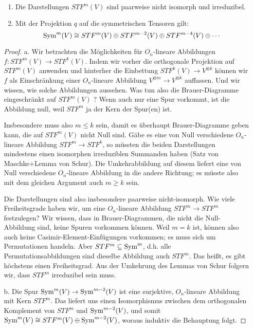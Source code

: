 \begin{theorem}
\begin{enumerate}
\item Die Darstellungen $STF^m(V)$ sind paarweise nicht isomorph und irreduzibel.
\item Mit der Projektion $q$ auf die symmetrischen Tensoren gilt:
\[\operatorname{Sym}^m(V) \cong STF^m(V) \oplus STF^{m-2}(V) \oplus STF^{m-4}(V) \oplus \cdots\]
\end{enumerate}
\end{theorem}
\begin{proof}
a. Wir betrachten die Möglichkeiten für $O_n$-lineare Abbildungen $f: STF^m(V) \to STF^k(V)$. Indem wir vorher die orthogonale Projektion auf $STF^m(V)$ anwenden und hinterher die Einbettung $STF^k(V) \to V^{\otimes k}$ können wir $f$ als Einschränkung einer $O_n$-lineare Abbildung $V^{\otimes m} \to V^{\otimes k}$ auffassen. Und wir wissen, wie solche Abbildungen aussehen. Was tun also die Brauer-Diagramme eingeschränkt auf $STF^m(V)$ ? Wenn auch nur eine Spur vorkommt, ist die Abbildung null, weil $STF^m$ ja der Kern der Spur(en) ist.

Insbesondere muss also $m\leq k$ sein, damit es überhaupt Brauer-Diagramme geben kann, die auf $STF^m(V)$ nicht Null sind. Gäbe es eine von Null verschiedene $O_n$-lineare Abbildung $STF^m\to STF^k$, so müssten die beiden Darstellungen mindestens einen isomorphen irreduziblen Summanden haben (Satz von Maschke+Lemma von Schur). Die Umkehrabbildung auf diesem liefert eine von Null verschiedene $O_n$-lineare Abbildung in die andere Richtung; es müsste also mit dem gleichen Argument auch $m\geq k$ sein.

Die Darstellungen sind also insbesondere paarweise nicht-isomorph. Wie viele Freiheitsgrade haben wir, um eine $O_n$-lineare Abbildung $STF^m\to STF^m$ festzulegen? Wir wissen, dass in Brauer-Diagrammen, die nicht die Null-Abbildung sind, keine Spuren vorkommen können. Weil $m=k$ ist, können also auch keine Casimir-Element-Einfügungen vorkommen; es muss sich um Permutationen handeln. Aber $STF^m \subseteq\operatorname{Sym}^m$, d.h. alle Permutationsabbildungen sind dieselbe Abbildung auch $STF^m$. Das heißt, es gibt höchstens einen Freiheitsgrad. Aus der Umkehrung des Lemmas von Schur folgern wir, dass $STF^m$ irreduzibel sein muss.

\medbreak
b. Die Spur $\operatorname{Sym}^m(V) \to \operatorname{Sym}^{m-2}(V)$ ist eine surjektive, $O_n$-lineare Abbildung mit Kern $STF^m$. Das liefert uns einen Isomorphismus zwischen dem orthogonalen Komplement von $STF^m$ und $\operatorname{Sym}^{m-2}(V)$, und somit $\operatorname{Sym}^m(V) \cong STF^m(V) \oplus \operatorname{Sym}^{m-2}(V)$, woraus induktiv die Behauptung folgt.
\end{proof}